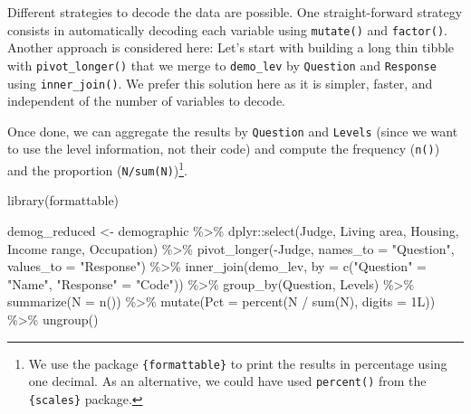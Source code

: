 \documentclass[
]{krantz}
\makeatletter
\newenvironment{Shaded}{\begin{snugshade}}{\end{snugshade}}
\newcommand{\AttributeTok}[1]{\textcolor[rgb]{0.61,0.61,0.61}{#1}}
\newcommand{\FunctionTok}[1]{\textcolor[rgb]{0,0,0}{#1}}
\newcommand{\NormalTok}[1]{#1}
\newcommand{\OtherTok}[1]{\textcolor[rgb]{0.37,0.37,0.37}{#1}}
\newcommand{\SpecialCharTok}[1]{\textcolor[rgb]{0,0,0}{#1}}
\newcommand{\StringTok}[1]{\textcolor[rgb]{0.5,0.5,0.5}{#1}}
\newenvironment{kframe}{%
\medskip{}
\setlength{\fboxsep}{.8em}
 \def\at@end@of@kframe{}%
 \ifinner\ifhmode%
  \def\at@end@of@kframe{\end{minipage}}%
  \begin{minipage}{\columnwidth}%
 \fi\fi%
 \def\FrameCommand##1{\hskip\@totalleftmargin \hskip-\fboxsep
 \colorbox{shadecolor}{##1}\hskip-\fboxsep
     \hskip-\linewidth \hskip-\@totalleftmargin \hskip\columnwidth}%
 \MakeFramed {\advance\hsize-\width
   \@totalleftmargin\z@ \linewidth\hsize
   \@setminipage}}%
 {\par\unskip\endMakeFramed%
 \at@end@of@kframe}
\renewenvironment{Shaded}{\begin{kframe}}{\end{kframe}}
\makeatother
\begin{document}
Different strategies to decode the data are possible. One straight-forward strategy consists in automatically decoding each variable using \texttt{mutate()} and \texttt{factor()}. Another approach is considered here: Let's start with building a long thin tibble with \texttt{pivot\_longer()} that we merge to \texttt{demo\_lev} by \texttt{Question} and \texttt{Response} using \texttt{inner\_join()}. We prefer this solution here as it is simpler, faster, and independent of the number of variables to decode.

Once done, we can aggregate the results by \texttt{Question} and \texttt{Levels} (since we want to use the level information, not their code) and compute the frequency (\texttt{n()}) and the proportion (\texttt{N/sum(N)})\footnote{We use the package \texttt{\{formattable\}} to print the results in percentage using one decimal. As an alternative, we could have used \texttt{percent()} from the \texttt{\{scales\}} package.}.

\begin{Shaded}
\begin{Highlighting}[]
\FunctionTok{library}\NormalTok{(formattable)}

\NormalTok{demog\_reduced }\OtherTok{\textless{}{-}}\NormalTok{ demographic }\SpecialCharTok{\%\textgreater{}\%}
\NormalTok{  dplyr}\SpecialCharTok{::}\FunctionTok{select}\NormalTok{(Judge, }\StringTok{\textasciigrave{}}\AttributeTok{Living area}\StringTok{\textasciigrave{}}\NormalTok{, Housing, }\StringTok{\textasciigrave{}}\AttributeTok{Income range}\StringTok{\textasciigrave{}}\NormalTok{, }\StringTok{\textasciigrave{}}\AttributeTok{Occupation}\StringTok{\textasciigrave{}}\NormalTok{) }\SpecialCharTok{\%\textgreater{}\%}
  \FunctionTok{pivot\_longer}\NormalTok{(}\SpecialCharTok{{-}}\NormalTok{Judge, }\AttributeTok{names\_to =} \StringTok{"Question"}\NormalTok{, }\AttributeTok{values\_to =} \StringTok{"Response"}\NormalTok{) }\SpecialCharTok{\%\textgreater{}\%}
  \FunctionTok{inner\_join}\NormalTok{(demo\_lev, }\AttributeTok{by =} \FunctionTok{c}\NormalTok{(}\StringTok{"Question"} \OtherTok{=} \StringTok{"Name"}\NormalTok{, }\StringTok{"Response"} \OtherTok{=} \StringTok{"Code"}\NormalTok{)) }\SpecialCharTok{\%\textgreater{}\%}
  \FunctionTok{group\_by}\NormalTok{(Question, Levels) }\SpecialCharTok{\%\textgreater{}\%}
  \FunctionTok{summarize}\NormalTok{(}\AttributeTok{N =} \FunctionTok{n}\NormalTok{()) }\SpecialCharTok{\%\textgreater{}\%}
  \FunctionTok{mutate}\NormalTok{(}\AttributeTok{Pct =} \FunctionTok{percent}\NormalTok{(N }\SpecialCharTok{/} \FunctionTok{sum}\NormalTok{(N), }\AttributeTok{digits =}\NormalTok{ 1L)) }\SpecialCharTok{\%\textgreater{}\%}
  \FunctionTok{ungroup}\NormalTok{()}
\end{Highlighting}
\end{Shaded}
\end{document}
